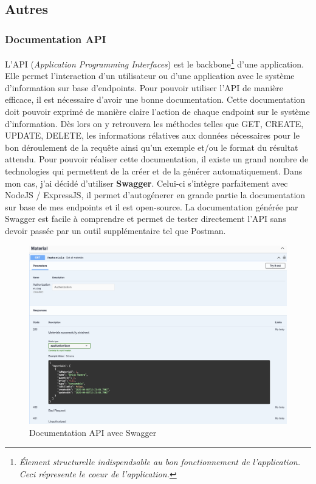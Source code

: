   
\subsection{Autres}
\subsubsection{Documentation API}


L'API (\textit{Application Programming Interfaces}) est le backbone\footnote{\textit{Élement structurelle indispendsable au bon fonctionnement de l'application. Ceci répresente le coeur de l'application.}} d'une application. Elle permet l'interaction d'un utilisateur ou d'une application avec le système d'information sur base d'endpoints.
Pour pouvoir utiliser l'API de manière efficace, il est nécessaire d'avoir une bonne documentation. Cette documentation doit pouvoir exprimé de manière claire l'action de chaque endpoint sur le système d'information. Dès lors on y retrouvera les méthodes telles que GET, CREATE, UPDATE, DELETE, les informations rélatives aux données nécessaires pour le bon déroulement de la requête ainsi qu'un exemple et/ou le format du résultat attendu.
\newpage
Pour pouvoir réaliser cette documentation, il existe un grand nombre de technologies qui permettent de la créer et de la générer automatiquement. Dans mon cas, j'ai décidé d'utiliser \textbf{Swagger}. Celui-ci s'intègre parfaitement avec NodeJS / ExpressJS, il permet d'autogénerer en grande partie la documentation sur base de mes endpoints et il est open-source.
La documentation générée par Swagger est facile à comprendre et permet de tester directement l'API sans devoir passée par un outil supplémentaire tel que Postman.

\begin{figure}[H]
  \centering
  \includegraphics[width=0.75\linewidth]{img/docApi.png}
  \caption{ Documentation API avec Swagger}
  \label{Swagger}
\end{figure}
